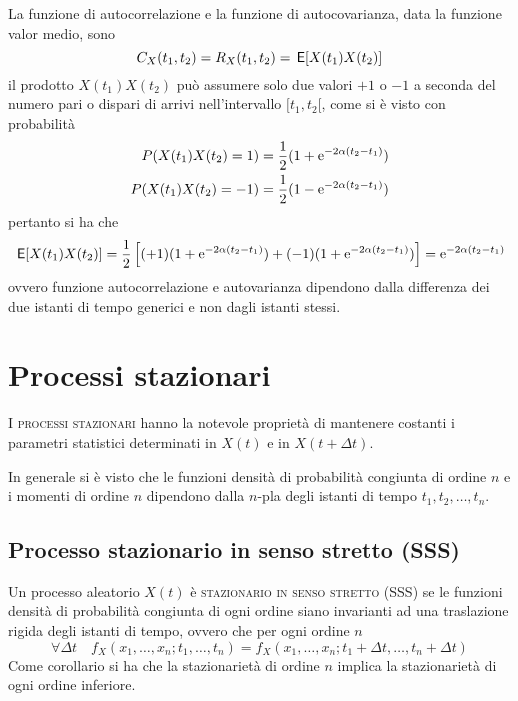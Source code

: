 La funzione di autocorrelazione e la funzione di autocovarianza, data la funzione valor medio, sono
\[
	C_X(t_1,t_2)=R_X(t_1,t_2)=\,{\operatorname{\mathsf{E}}}\!\left[{X(t_1)X(t_2)}\right]
\]
il prodotto $X(t_1)X(t_2)$ può assumere solo due valori $+1$ o $-1$ a seconda del numero pari o dispari di arrivi nell'intervallo $[t_1,t_2[$, come si è visto con probabilità
\[
\begin{split}
	P(X(t_1)X(t_2)=1)&=\frac{1}{2}(1+\operatorname{e}^{-2\alpha(t_2-t_1)})\\
	P(X(t_1)X(t_2)=-1)&=\frac{1}{2}(1-\operatorname{e}^{-2\alpha(t_2-t_1)})
\end{split}
\]
pertanto si ha che
\begin{equation}
\begin{split}
	\,{\operatorname{\mathsf{E}}}\!\left[{X(t_1)X(t_2)}\right]=\frac{1}{2}\left[(+1)(1+\operatorname{e}^{-2\alpha(t_2-t_1)})+(-1)(1+\operatorname{e}^{-2\alpha(t_2-t_1)})\right]=\operatorname{e}^{-2\alpha(t_2-t_1)}
\end{split}
\end{equation}
ovvero funzione autocorrelazione e autovarianza dipendono dalla differenza dei due istanti di tempo generici e non dagli istanti stessi.

\section{Processi stazionari}
I \textsc{processi stazionari} hanno la notevole proprietà di mantenere costanti i parametri statistici determinati in $X(t)$ e in $X(t+\Delta t)$.

In generale si è visto che le funzioni densità di probabilità congiunta di ordine $n$ e i momenti di ordine $n$ dipendono dalla $n$-pla degli istanti di tempo $t_1,t_2,\dots,t_n$.

\subsection{Processo stazionario in senso stretto (SSS)}
Un processo aleatorio $X(t)$ è \textsc{stazionario in senso stretto (SSS)} se le funzioni densità di probabilità congiunta di ogni ordine siano invarianti ad una traslazione rigida degli istanti di tempo, ovvero che per ogni ordine $n$
\begin{equation}
	\forall\Delta t\quad f_X(x_1,\dots,x_n;t_1,\dots,t_n)=f_X(x_1,\dots,x_n;t_1+\Delta t,\dots,t_n+\Delta t)
\end{equation}
Come corollario si ha che la stazionarietà di ordine $n$ implica la stazionarietà di ogni ordine inferiore.

